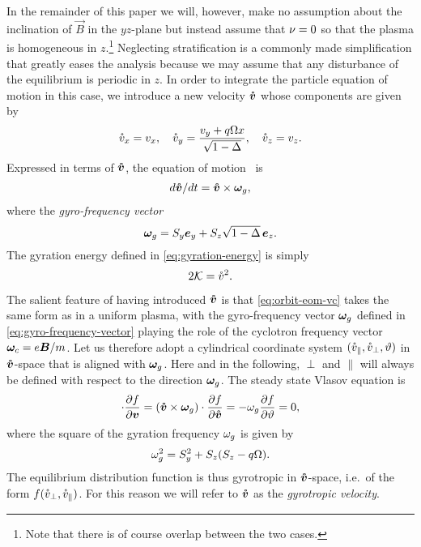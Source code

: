 \documentclass[aps,pre,notitlepage,amsmath,amssymb,amsfonts,nobibnotes,nofootinbib]{revtex4-1}
\begin{document}
In the remainder of this paper we will, however, make no assumption about the
inclination of $\vec{B}$ in the $yz$-plane but instead assume that $\nu=0$
so that the plasma is homogeneous in $z$.\footnote{Note that there is of
  course overlap between the two cases.} Neglecting stratification is a
commonly made simplification that greatly eases the analysis because we may
assume that any disturbance of the equilibrium is periodic in $z$. In order to
integrate the particle equation of motion in this case, we introduce a new
velocity $\bm{\mathring{v}}$ whose components are given by
\begin{equation}
  \label{eq:gyrotropic-velocity}
  \vc_x = v_x,\quad
  \vc_y = \frac{v_y + q\Omega x}{\sqrt{1-\Delta}},\quad
  \vc_z = v_z.
\end{equation}
Expressed in terms of $\bm{\mathring{v}}$, the equation of
motion~ is
\begin{align}
  \label{eq:orbit-eom-vc}
  d\vvc/dt = \vvc\times\vomg,
\end{align}
where the \emph{gyro-frequency vector}
\begin{equation}
  \label{eq:gyro-frequency-vector}
  \vomg = S_y\ey + S_z\sqrt{1-\Delta}\,\ez.
\end{equation}
The gyration energy defined in \cref{eq:gyration-energy} is simply
\begin{equation}
  \label{eq:gyration-energy-vc}
  2\mathcal{K} = \vc^2.
\end{equation}

The salient feature of having introduced $\bm{\mathring{v}}$ is that \cref{eq:orbit-eom-vc}
takes the same form as in a uniform plasma, with the gyro-frequency vector
$\bm{\omega}_g$ defined in \cref{eq:gyro-frequency-vector} playing the role of the
cyclotron frequency vector $\bm{\omega}_c=e\bm{B}/m$. Let us therefore adopt a
cylindrical coordinate system $(\mathring{v}_\parallel,\mathring{v}_\perp,\vartheta)$ in
$\bm{\mathring{v}}$-space that is aligned with $\bm{\omega}_g$. Here and in the following, $\perp$
and $\parallel$ will always be defined with respect to the direction $\bm{\omega}_g$.
The steady state Vlasov equation is
\begin{equation}
  [(\vec{v} + q\Omega x\ey)\times\vec{S}]\cdot\pder{f}{\vec{v}}
  = (\vvc\times\vomg)\cdot\pder{f}{\vvc} = -\omg\pder{f}{\vartheta} = 0,
\end{equation}
where the square of the gyration frequency $\omega_g$ is given by
\begin{equation}
  \label{eq:gyro-frequency}
  \omg^2 = S_y^2 + S_z(S_z - q\Omega).
\end{equation}
The equilibrium distribution function is thus gyrotropic in $\bm{\mathring{v}}$-space,
i.e.\ of the form $f(\mathring{v}_\perp,\mathring{v}_\parallel)$. For this reason we will refer
to $\bm{\mathring{v}}$ as the \emph{gyrotropic velocity}.
\end{document}
